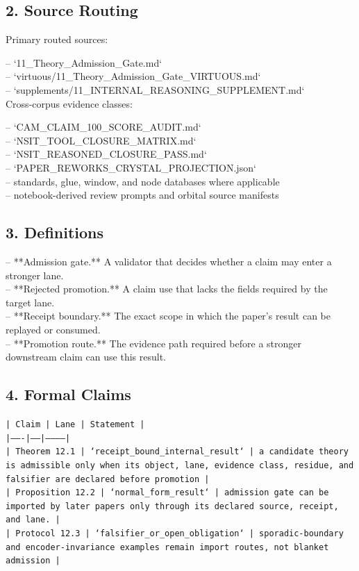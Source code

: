 \documentclass[11pt]{article}
\begin{document}
\subsection*{2. Source Routing}

Primary routed sources:

\noindent{}-- `11\_Theory\_Admission\_Gate.md`\\
\noindent{}-- `virtuous/11\_Theory\_Admission\_Gate\_VIRTUOUS.md`\\
\noindent{}-- `supplements/11\_INTERNAL\_REASONING\_SUPPLEMENT.md`\\

Cross-corpus evidence classes:

\noindent{}-- `CAM\_CLAIM\_100\_SCORE\_AUDIT.md`\\
\noindent{}-- `NSIT\_TOOL\_CLOSURE\_MATRIX.md`\\
\noindent{}-- `NSIT\_REASONED\_CLOSURE\_PASS.md`\\
\noindent{}-- `PAPER\_REWORKS\_CRYSTAL\_PROJECTION.json`\\
\noindent{}-- standards, glue, window, and node databases where applicable\\
\noindent{}-- notebook-derived review prompts and orbital source manifests\\

\subsection*{3. Definitions}

\noindent{}-- **Admission gate.** A validator that decides whether a claim may enter a stronger lane.\\
\noindent{}-- **Rejected promotion.** A claim use that lacks the fields required by the target lane.\\
\noindent{}-- **Receipt boundary.** The exact scope in which the paper's result can be replayed or consumed.\\
\noindent{}-- **Promotion route.** The evidence path required before a stronger downstream claim can use this result.\\

\subsection*{4. Formal Claims}

\noindent\texttt{| Claim | Lane | Statement |}\\
\noindent\texttt{|-------|------|-----------|}\\
\noindent\texttt{| Theorem 12.1 | `receipt\_bound\_internal\_result` | a candidate theory is admissible only when its object, lane, evidence class, residue, and falsifier are declared before promotion |}\\
\noindent\texttt{| Proposition 12.2 | `normal\_form\_result` | admission gate can be imported by later papers only through its declared source, receipt, and lane. |}\\
\noindent\texttt{| Protocol 12.3 | `falsifier\_or\_open\_obligation` | sporadic-boundary and encoder-invariance examples remain import routes, not blanket admission |}\\
\end{document}

